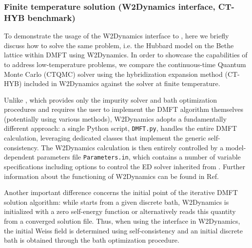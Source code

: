 \documentclass[edipack_sp.tex]{subfiles}
\begin{document}
\subsubsection{Finite temperature solution (W2Dynamics interface, CT-HYB benchmark)}\label{SecExamplesBetheDMFTW2D}
To demonstrate the usage of the W2Dynamics interface to \NAME,  here we briefly discuss how to solve the same problem, i.e. the Hubbard model on the Bethe lattice within DMFT using W2Dynamics. 
In order to showcase the capabilities of \NAME to address low-temperature problems, we compare the continuous-time Quantum Monte Carlo (CTQMC) solver using the hybridization expansion method (CT-HYB) included in W2Dynamics against the \NAME solver at finite temperature.  

Unlike \NAME, which provides only the impurity solver and bath optimization procedures and requires the user to implement the DMFT algorithm themselves (potentially using various methods), W2Dynamics adopts a fundamentally different approach: a single Python script, {\tt DMFT.py}, handles the entire DMFT calculation, leveraging dedicated classes that implement the generic self-consistency. The W2Dynamics calculation is then entirely controlled by a model-dependent parameters file {\tt Parameters.in}, which contains a number of variable specifications including options to control the ED solver inherited from \NAME. Further information about the functioning of W2Dynamics can be found in Ref.~\cite{Wallerberger2019CPC}           

Another important difference concerns the initial point of the iterative DMFT solution algorithm: while \NAME starts from a given discrete bath, W2Dynamics is initialized with a zero self-energy function or alternatively reads this quantity from a converged solution file. Thus, when using the \NAME interface in W2Dynamics, the initial Weiss field is determined using self-consistency and  an initial discrete bath is obtained through the \NAME bath optimization procedure. 
\end{document}
